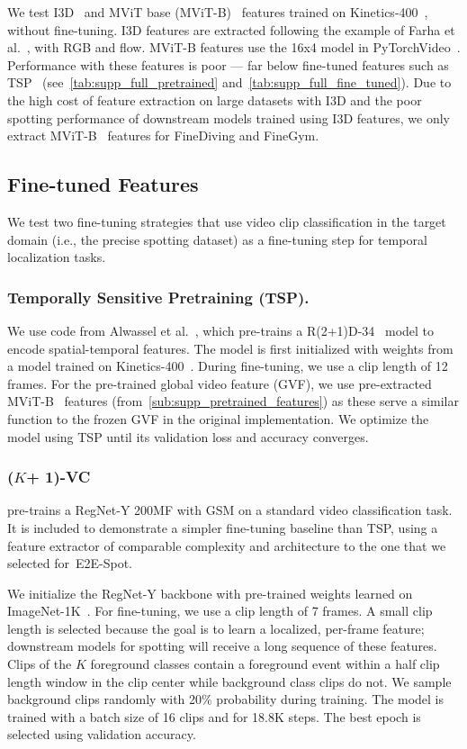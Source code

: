 \documentclass[runningheads]{llncs}
\newcommand{\notation}[1]{\ensuremath{#1}\xspace}
\newcommand{\OURMETHOD}{{E2E-Spot}\xspace}
\newcommand{\finegym}{{FineGym}\xspace}
\newcommand{\finediving}{{FineDiving}\xspace}
\newcommand{\NumClasses}{\notation{K}}
\begin{document}
We test I3D~\cite{i3d} and MViT base (MViT-B)~\cite{mvit} features trained on Kinetics-400~\cite{kinetics}, without fine-tuning.
I3D features are extracted following the example of Farha et al.~\cite{mstcn}, with RGB and flow.
MViT-B features use the 16x4 model in PyTorchVideo~\cite{pytorchvideo}.
Performance with these features is poor --- far below fine-tuned features such as TSP~\cite{tsp} (see~\autoref{tab:supp_full_pretrained} and~\ref{tab:supp_full_fine_tuned}).
Due to the high cost of feature extraction on large datasets with I3D and the poor spotting performance of downstream models trained using I3D features, we only extract MViT-B~\cite{mvit} features for \finediving and \finegym.

\subsection{Fine-tuned Features}

We test two fine-tuning strategies that use video clip classification in the target domain (i.e., the precise spotting dataset) as a fine-tuning step for temporal localization tasks.

\subsubsection*{Temporally Sensitive Pretraining (TSP).}
We use code from Alwassel et al.~\cite{tsp}, which pre-trains a R(2+1)D-34~\cite{r21d} model to encode spatial-temporal features.
The model is first initialized with weights from a model trained on Kinetics-400~\cite{kinetics}.
During fine-tuning, we use a clip length of 12 frames.
For the pre-trained global video feature (GVF), we use pre-extracted MViT-B~\cite{mvit} features (from~\autoref{sub:supp_pretrained_features}) as these serve a similar function to the frozen GVF in the original implementation.
We optimize the model using TSP until its validation loss and accuracy converges.

\subsubsection*{(\NumClasses + 1)-VC} pre-trains a RegNet-Y 200MF with GSM on a standard video classification task.
It is included to demonstrate a simpler fine-tuning baseline than TSP, using a feature extractor of comparable complexity and architecture to the one that we selected for~\OURMETHOD.

We initialize the RegNet-Y backbone with pre-trained weights learned on ImageNet-1K~\cite{imagenet}.
For fine-tuning, we use a clip length of 7 frames.
A small clip length is selected because the goal is to learn a localized, per-frame feature; downstream models for spotting will receive a long sequence of these features.
Clips of the $\NumClasses$ foreground classes contain a foreground event within a half clip length window in the clip center while background class clips do not.
We sample background clips randomly with 20\% probability during training.
The model is trained with a batch size of 16 clips and for 18.8K steps.
The best epoch is selected using validation accuracy.
\end{document}
